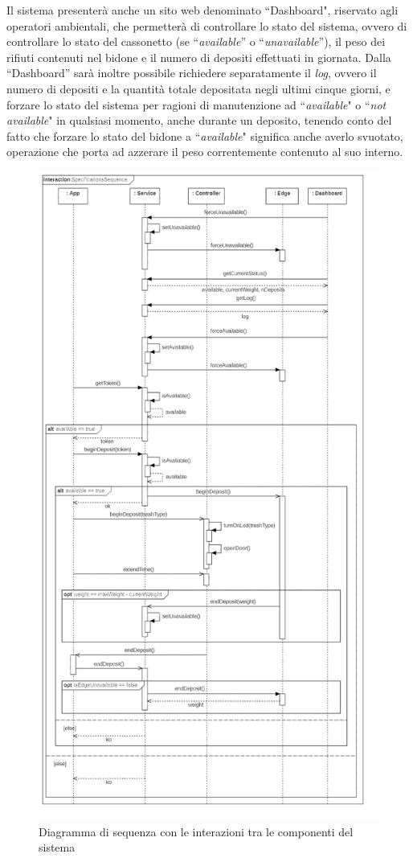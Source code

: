 \documentclass[a4paper, 12pt]{report}
\begin{document}
	Il sistema presenterà anche un sito web denominato ``Dashboard", riservato agli operatori
	ambientali, che permetterà di controllare lo stato del sistema, ovvero di controllare lo stato del
	cassonetto (se ``\textit{available}'' o ``\textit{unavailable}''), il peso dei rifiuti contenuti nel bidone e il 
	numero di depositi effettuati in giornata. Dalla ``Dashboard'' sarà inoltre possibile richiedere separatamente il \textit{log},
	ovvero il numero di depositi e la quantità totale depositata negli ultimi cinque giorni, e
	forzare lo stato del sistema per ragioni di manutenzione ad ``\textit{available}" o
	``\textit{not available}" in qualsiasi momento, anche durante un deposito, tenendo conto del fatto
	che forzare lo stato del bidone a ``\textit{available}" significa anche averlo svuotato, operazione che 
	porta ad azzerare il peso correntemente contenuto al suo interno.
	\begin{figure}[H]
		\centering
		\includegraphics[height=\textheight]{"img/Sequence"}    
		\caption{Diagramma di sequenza con le interazioni tra le componenti del sistema}
	\end{figure}
\end{document}
